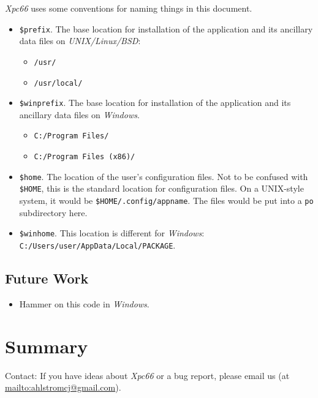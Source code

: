 \documentclass[
 11pt,
 twoside,
 a4paper,
 final                                 %
]{article}
\begin{document}
   \textsl{Xpc66} uses some conventions for naming things in this
   document.

   \begin{itemize}
      \item \texttt{\$prefix}. The base location for installation of
         the application and its ancillary data files on
         \textsl{UNIX/Linux/BSD}:
         \begin{itemize}
            \item \texttt{/usr/}
            \item \texttt{/usr/local/}
         \end{itemize}
      \item \texttt{\$winprefix}. The base location for installation of
         the application and its ancillary data files on \textsl{Windows}.
         \begin{itemize}
            \item \texttt{C:/Program Files/}
            \item \texttt{C:/Program Files (x86)/}
         \end{itemize}
      \item \texttt{\$home}. The location of the user's configuration files.
         Not to be confused with \texttt{\$HOME}, this is
         the standard location for configuration files.
         On a UNIX-style system, it would be \linebreak
         \texttt{\$HOME/.config/appname}.
         The files would be put into a \texttt{po} subdirectory here.
      \item \texttt{\$winhome}. This location is different for
         \textsl{Windows}:
         \texttt{C:/Users/user/AppData/Local/PACKAGE}.
   \end{itemize}

\subsection{Future Work}
\label{subsec:introduction_future}

   \begin{itemize}
      \item Hammer on this code in \textsl{Windows}.
   \end{itemize}





\section{Summary}
\label{sec:summary}

   Contact: If you have ideas about \textsl{Xpc66} or a bug report,
   please email us (at \url{mailto:ahlstromcj@gmail.com}).




\printindex
\end{document}
